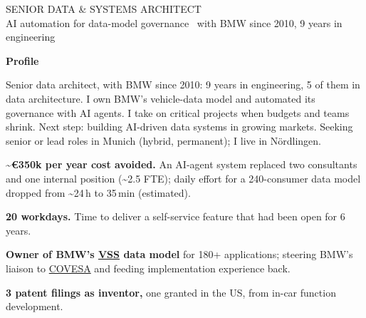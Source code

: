 \hspace{\cvgap}%
\begin{minipage}[t]{\mainw}\vspace{0pt}\RaggedRight
  {\color{accent}\fontsize{18}{21}\selectfont SENIOR DATA \& SYSTEMS ARCHITECT}\\[1.2mm]
  {\color{subgray}\fontsize{11}{13}\selectfont AI automation for data-model governance \textemdash\ with BMW since 2010, 9 years in engineering}
  \par\vspace{0.6mm}{\color{accent}\rule{\linewidth}{1.1pt}}

  \vspace{1.6mm}
  {\color{accent}\fontsize{11}{13}\selectfont\bfseries Profile}\par\vspace{0.8mm}
  Senior data architect, with BMW since 2010: 9 years in engineering, 5 of them in data architecture. I own BMW's vehicle-data model and automated its governance with AI agents. I take on critical projects when budgets and teams shrink. Next step: building AI-driven data systems in growing markets. Seeking senior or lead roles in Munich (hybrid, permanent); I live in N\"ordlingen.\par

  \begin{cvhl}
    \item \textbf{\textasciitilde€350k per year cost avoided.} An AI-agent system replaced two consultants and one internal position (\textasciitilde2.5 FTE); daily effort for a 240-consumer data model dropped from \textasciitilde24\,h to 35\,min (estimated).
    \item \textbf{20 workdays.} Time to deliver a self-service feature that had been open for 6 years.
    \item \textbf{Owner of BMW's \href{https://github.com/COVESA/vehicle_signal_specification}{VSS} data model} for 180+ applications; steering BMW's liaison to \href{https://covesa.global}{COVESA} and feeding implementation experience back.
    \item \textbf{3 patent filings as inventor,} one granted in the US, from in-car function development.
  \end{cvhl}


\end{minipage}
